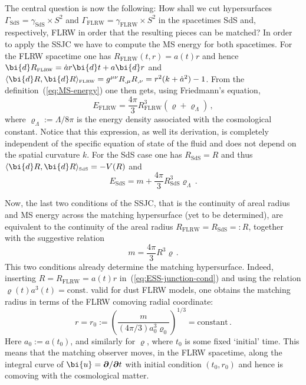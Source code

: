 \documentclass
[rmp,aps,twocolumn,showpacs,preprintnumbers,amsmath,amssymb]{revtex4}
\theoremstyle{plain}
\theoremstyle{definition}
\theoremstyle{remark}
\newcommand{\sss}{\scriptscriptstyle}
\newcommand{\ind}[1]{{\sss \text{#1}}}        %
\newcommand{\sprod}[2]{\langle#1,#2\rangle}   %
\newcommand{\bpartial}{\boldsymbol{\partial}} %
\newcommand{\ed}{\bi{d}}                      %
\newcommand{\Stwo}{{S^2}}                         %
\newcommand{\bu}{\bi{u}}
\begin{document}
The central question is now the following: How shall we cut hypersurfaces 
$\varGamma_\ind{SdS}  = \gamma_\ind{SdS}  \times\Stwo$ and 
$\varGamma_\ind{FLRW} = \gamma_\ind{FLRW} \times\Stwo$ in the 
spacetimes SdS and, respectively, FLRW in order that the resulting 
pieces can be matched? In order to apply the SSJC we have to compute 
the MS energy for both spacetimes. For the FLRW spacetime one has 
$R_\ind{FLRW}(t,r)=a(t)r$ and hence 
$\ed R_\ind{FLRW} = \dot a r \ed t + a \ed r$ and 
$\sprod{\ed R}{\ed R}_\ind{FLRW}=g^{\mu\nu}R_{,\mu}R_{,\nu}
=r^2(k+\dot{a}^2)-1$. From 
the definition~(\ref{eq:MS-energy}) one then gets, using Friedmann's equation, 
%
\begin{equation}\label{eq:MSE-FLRW}
  E_\ind{FLRW} = \frac{4\pi}{3}R_\ind{FLRW}^3(\varrho + \varrho_\Lambda) \,,
\end{equation}
%
where $\varrho_\Lambda:=\Lambda/8\pi$ is the energy density associated with 
the cosmological constant. Notice that this expression, as well its 
derivation, is completely independent of the specific equation of state of 
the fluid and does not depend on the spatial curvature $k$. 
For the SdS case one has $R_\ind{SdS}=R$ and thus 
$\sprod{\ed R}{\ed R}_\ind{SdS}=-V(R)$ and
%
\begin{equation}\label{eq:MSE-SdS}
  E_\ind{SdS} = m + \frac{4\pi}{3}R_\ind{SdS}^3 \varrho_\Lambda \,.
\end{equation}
%

Now, the last two conditions of the SSJC, that is the continuity of areal 
radius and MS energy across the matching hypersurface (yet to be 
determined), are equivalent to the continuity of the areal radius 
$R_\ind{FLRW}=R_\ind{SdS}=:R$, together with the suggestive relation 
%
\begin{equation}\label{eq:ESS-junction-cond}
  m = \frac{4\pi}{3}R^3\varrho \,.
\end{equation}
%
This two conditions already determine the matching hypersurface. Indeed, 
inserting $R=R_\ind{FLRW}=a(t)r$ in~(\ref{eq:ESS-junction-cond}) and 
using the relation $\varrho(t)a^3(t)=\text{const.}$ valid for dust FLRW
models, one obtains the matching radius in terms of the FLRW comoving 
radial coordinate: 
%
\begin{equation}\label{eq:ESS-matching-curve-FLRW}
  r = r_0 
   := \left( \frac{m}{(4\pi/3)a_\ind{0}^3\varrho_\ind{0}} \right)^{1/3} 
    =\text{constant}\,.
\end{equation}
%
Here $a_\ind{0}:=a(t_\ind{0})$, and similarly for $\varrho$, where 
$t_\ind{0}$ is some fixed `initial' time.
This means that the matching observer moves, in the FLRW spacetime, 
along the integral curve of $\bu=\bpartial/\bpartial t$ with initial 
condition $(t_\ind{0},r_\ind{0})$ and hence is comoving with the cosmological
matter. 
\end{document}
